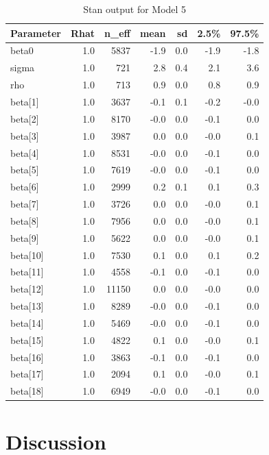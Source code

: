 \documentclass[]{article}
\begin{document}
\begin{table}[ht]
\centering
\begin{tabular}{lrrrrrr}
  \toprule
Parameter & Rhat & n\_eff & mean & sd & 2.5\% & 97.5\% \\ 
  \midrule
beta0 & 1.0 & 5837 & -1.9 & 0.0 & -1.9 & -1.8 \\ 
  sigma & 1.0 & 721 & 2.8 & 0.4 & 2.1 & 3.6 \\ 
  rho & 1.0 & 713 & 0.9 & 0.0 & 0.8 & 0.9 \\ 
  beta[1] & 1.0 & 3637 & -0.1 & 0.1 & -0.2 & -0.0 \\ 
  beta[2] & 1.0 & 8170 & -0.0 & 0.0 & -0.1 & 0.0 \\ 
  beta[3] & 1.0 & 3987 & 0.0 & 0.0 & -0.0 & 0.1 \\ 
  beta[4] & 1.0 & 8531 & -0.0 & 0.0 & -0.1 & 0.0 \\ 
  beta[5] & 1.0 & 7619 & -0.0 & 0.0 & -0.1 & 0.0 \\ 
  beta[6] & 1.0 & 2999 & 0.2 & 0.1 & 0.1 & 0.3 \\ 
  beta[7] & 1.0 & 3726 & 0.0 & 0.0 & -0.0 & 0.1 \\ 
  beta[8] & 1.0 & 7956 & 0.0 & 0.0 & -0.0 & 0.1 \\ 
  beta[9] & 1.0 & 5622 & 0.0 & 0.0 & -0.0 & 0.1 \\ 
  beta[10] & 1.0 & 7530 & 0.1 & 0.0 & 0.1 & 0.2 \\ 
  beta[11] & 1.0 & 4558 & -0.1 & 0.0 & -0.1 & 0.0 \\ 
  beta[12] & 1.0 & 11150 & 0.0 & 0.0 & -0.0 & 0.0 \\ 
  beta[13] & 1.0 & 8289 & -0.0 & 0.0 & -0.1 & 0.0 \\ 
  beta[14] & 1.0 & 5469 & -0.0 & 0.0 & -0.1 & 0.0 \\ 
  beta[15] & 1.0 & 4822 & 0.1 & 0.0 & -0.0 & 0.1 \\ 
  beta[16] & 1.0 & 3863 & -0.1 & 0.0 & -0.1 & 0.0 \\ 
  beta[17] & 1.0 & 2094 & 0.1 & 0.0 & -0.0 & 0.1 \\ 
  beta[18] & 1.0 & 6949 & -0.0 & 0.0 & -0.1 & 0.0 \\ 
   \bottomrule
\end{tabular}
\caption{Stan output for Model 5} 
\end{table}

\section{Discussion}\label{discussion}
\end{document}
